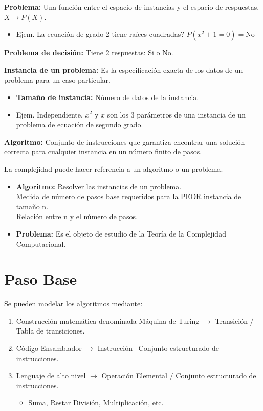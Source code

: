 \textbf{Problema:} Una función entre el espacio de instancias y el espacio de respuestas, $X \rightarrow P(X)$.
\begin{itemize}
  \item Ejem. La ecuación de grado 2 tiene raíces cuadradas? $P(x^2+1=0)=\text{No}$
\end{itemize}

\textbf{Problema de decisión:} Tiene 2 respuestas: Si o No.
\pagebreak

\textbf{Instancia de un problema:} Es la especificación exacta de los datos de un problema para un caso particular.
\begin{itemize}
  \item \textbf{Tamaño de instancia:} Número de datos de la instancia.
  \item Ejem. Independiente, $x^2$ y $x$ son los 3 parámetros de una instancia de un problema de ecuación de segundo grado.
\end{itemize}

\textbf{Algoritmo:} Conjunto de instrucciones que garantiza encontrar una solución correcta para cualquier instancia en un número finito de pasos.

La complejidad puede hacer referencia a un algoritmo o un problema.
\begin{itemize}
  \item \textbf{Algoritmo:} Resolver las instancias de un problema. \\ Medida de número de pasos base requeridos para la PEOR instancia de tamaño n. \\ Relación entre n y el número de pasos.
  \item \textbf{Problema:} Es el objeto de estudio de la Teoría de la Complejidad Computacional.
\end{itemize}

\section{Paso Base}\label{sec:paso-base}
Se pueden modelar los algoritmos mediante:
\begin{enumerate}
    \item Construcción matemática denominada Máquina de Turing $\rightarrow$ Transición / Tabla de transiciones.
  \item Código Ensamblador $\rightarrow$ Instrucción \ Conjunto estructurado de instrucciones.
  \item Lenguaje de alto nivel $\rightarrow$ Operación Elemental / Conjunto estructurado de instrucciones.
    \begin{itemize}
      \item Suma, Restar División, Multiplicación, etc.
    \end{itemize}
\end{enumerate}

